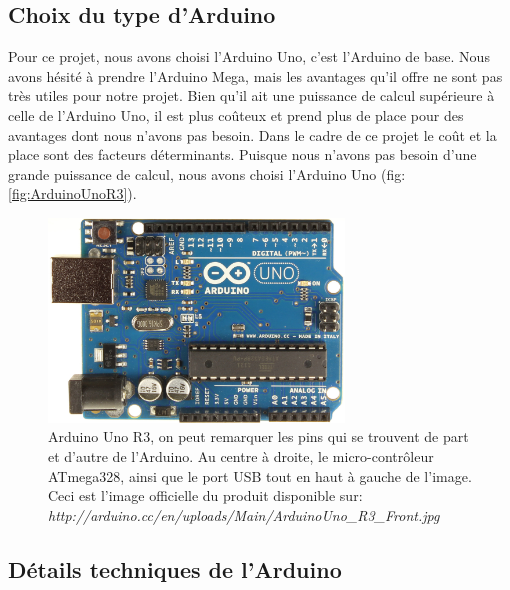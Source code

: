 \documentclass[a4paper,11pt]{report}
\begin{document}
{\subsection{Choix du type d'Arduino}
Pour ce projet, nous avons choisi l'Arduino Uno, c'est l'Arduino de base.  Nous avons hésité à prendre l'Arduino Mega, mais les avantages qu'il offre ne sont pas très utiles pour notre projet. Bien qu'il ait une puissance de calcul supérieure à celle de l'Arduino Uno, il est plus coûteux et prend plus de place pour des avantages dont nous n'avons pas besoin. Dans le cadre de ce projet le coût et la place sont des facteurs déterminants.  Puisque nous n'avons pas besoin d'une grande puissance de calcul, nous avons choisi l'Arduino Uno (fig: \ref{fig:ArduinoUnoR3}).\\

\begin{figure}[h]
\begin{center}
\includegraphics[width = 0.7\textwidth]{arduino_uno_official.jpg}
\caption[Arduino Uno R3]{Arduino Uno R3\label{fig:ArduinoUnoR3}, on peut
  remarquer les pins  \label{pin} qui se trouvent de part et d'autre de
  l'Arduino. Au centre à droite, le micro-contrôleur ATmega328, ainsi
  que le port USB tout en haut à gauche de l'image. Ceci est l'image
  officielle du produit disponible sur: \small{\emph{http://arduino.cc/en/uploads/Main/ArduinoUno\_R3\_Front.jpg}}} 
\end{center}
\end{figure}


\subsection{Détails techniques de l'Arduino}

}
\end{document}
